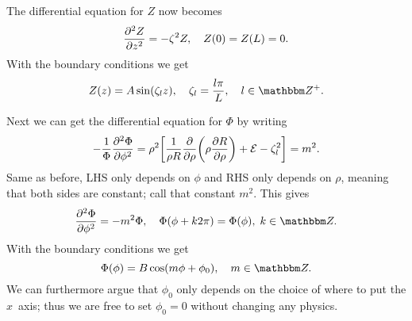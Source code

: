 \documentclass[11pt,letter, swedish, english
]{article}
\begin{document}
The differential equation for $Z$ now becomes
\begin{equation}
\pdv[2]{Z}{z}=-\zeta^2Z\qcomma
Z(0)=Z(L)=0.
\end{equation}
With the boundary conditions we get
\begin{equation}\label{eq:5a_Z}
Z(z)=A\sin(\zeta_l z)\qcomma 
\zeta_l=\frac{l\pi}{L}\qcomma l\in\Z^+.
\end{equation}

Next we can get the differential equation for $\Phi$ by writing
\begin{equation}
-\frac{1}{\Phi}\pdv[2]{\Phi}{\phi} 
= \rho^2\qty[\frac{1}{\rho R}\pdv{\rho}
\qty(\rho\pdv{R}{\rho})+\mathcal{E}-\zeta_l^2]
=m^2.
\end{equation}
Same as before, LHS only depends on $\phi$ and RHS only depends on
$\rho$, meaning that both sides are constant; call that constant
$m^2$. This gives
\begin{equation}
\pdv[2]{\Phi}{\phi} =-m^2\Phi\qcomma
\Phi(\phi+k2\pi)=\Phi(\phi),\;k\in\Z.
\end{equation}
With the boundary conditions we get
\begin{equation}
\Phi(\phi)=B\cos(m\phi+\phi_0)\qcomma
m\in\Z.
\end{equation}
We can furthermore argue that $\phi_0$ only depends on the choice of
where to put the $x$~axis; thus we are free to set $\phi_0=0$ without
changing any physics.
\end{document}
